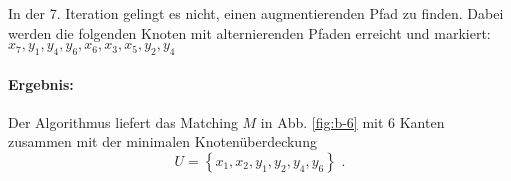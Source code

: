 \documentclass[a4paper]{scrartcl}
\begin{document}
\begin{enumerate}[label=\bfseries\arabic*.]
\begin{enumerate}
                \FloatBarrier

                In der 7. Iteration gelingt es nicht, einen augmentierenden Pfad
                zu finden.
                Dabei werden die folgenden Knoten mit alternierenden Pfaden
                erreicht und markiert:
                $x_7, y_1, y_4, y_6, x_6, x_3, x_5, y_2, y_4$

                \paragraph{Ergebnis:}
                Der Algorithmus liefert das Matching $M$ in Abb. \ref{fig:b-6}
                mit $6$ Kanten zusammen mit der minimalen Knotenüberdeckung
                \begin{equation}
                    U = \left\{ x_1, x_2, y_1, y_2, y_4, y_6 \right\} \text{ .}
                \end{equation}

        \end{enumerate}

\end{enumerate}
\end{document}
